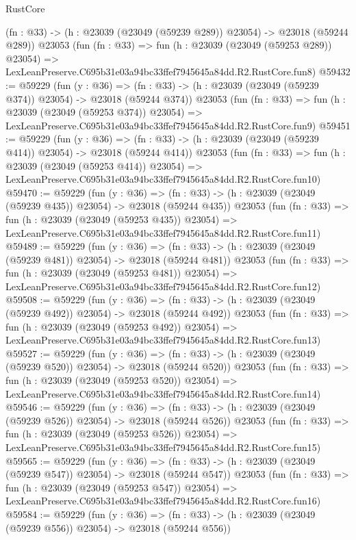 \begin{lexlean}{RustCore}
\begin{coremodule}
    (fn : @33) -> (h : @23039 (@23049 (@59239 @289)) @23054) -> @23018 (@59244 @289))
    @23053
    (fun (fn : @33) =>
    fun (h : @23039 (@23049 (@59253 @289)) @23054) =>
    LexLeanPreserve.C695b31e03a94bc33ffef7945645a84dd.R2.RustCore.fun8)
@59432 := @59229
    (fun (y : @36) =>
    (fn : @33) -> (h : @23039 (@23049 (@59239 @374)) @23054) -> @23018 (@59244 @374))
    @23053
    (fun (fn : @33) =>
    fun (h : @23039 (@23049 (@59253 @374)) @23054) =>
    LexLeanPreserve.C695b31e03a94bc33ffef7945645a84dd.R2.RustCore.fun9)
@59451 := @59229
    (fun (y : @36) =>
    (fn : @33) -> (h : @23039 (@23049 (@59239 @414)) @23054) -> @23018 (@59244 @414))
    @23053
    (fun (fn : @33) =>
    fun (h : @23039 (@23049 (@59253 @414)) @23054) =>
    LexLeanPreserve.C695b31e03a94bc33ffef7945645a84dd.R2.RustCore.fun10)
@59470 := @59229
    (fun (y : @36) =>
    (fn : @33) -> (h : @23039 (@23049 (@59239 @435)) @23054) -> @23018 (@59244 @435))
    @23053
    (fun (fn : @33) =>
    fun (h : @23039 (@23049 (@59253 @435)) @23054) =>
    LexLeanPreserve.C695b31e03a94bc33ffef7945645a84dd.R2.RustCore.fun11)
@59489 := @59229
    (fun (y : @36) =>
    (fn : @33) -> (h : @23039 (@23049 (@59239 @481)) @23054) -> @23018 (@59244 @481))
    @23053
    (fun (fn : @33) =>
    fun (h : @23039 (@23049 (@59253 @481)) @23054) =>
    LexLeanPreserve.C695b31e03a94bc33ffef7945645a84dd.R2.RustCore.fun12)
@59508 := @59229
    (fun (y : @36) =>
    (fn : @33) -> (h : @23039 (@23049 (@59239 @492)) @23054) -> @23018 (@59244 @492))
    @23053
    (fun (fn : @33) =>
    fun (h : @23039 (@23049 (@59253 @492)) @23054) =>
    LexLeanPreserve.C695b31e03a94bc33ffef7945645a84dd.R2.RustCore.fun13)
@59527 := @59229
    (fun (y : @36) =>
    (fn : @33) -> (h : @23039 (@23049 (@59239 @520)) @23054) -> @23018 (@59244 @520))
    @23053
    (fun (fn : @33) =>
    fun (h : @23039 (@23049 (@59253 @520)) @23054) =>
    LexLeanPreserve.C695b31e03a94bc33ffef7945645a84dd.R2.RustCore.fun14)
@59546 := @59229
    (fun (y : @36) =>
    (fn : @33) -> (h : @23039 (@23049 (@59239 @526)) @23054) -> @23018 (@59244 @526))
    @23053
    (fun (fn : @33) =>
    fun (h : @23039 (@23049 (@59253 @526)) @23054) =>
    LexLeanPreserve.C695b31e03a94bc33ffef7945645a84dd.R2.RustCore.fun15)
@59565 := @59229
    (fun (y : @36) =>
    (fn : @33) -> (h : @23039 (@23049 (@59239 @547)) @23054) -> @23018 (@59244 @547))
    @23053
    (fun (fn : @33) =>
    fun (h : @23039 (@23049 (@59253 @547)) @23054) =>
    LexLeanPreserve.C695b31e03a94bc33ffef7945645a84dd.R2.RustCore.fun16)
@59584 := @59229
    (fun (y : @36) =>
    (fn : @33) -> (h : @23039 (@23049 (@59239 @556)) @23054) -> @23018 (@59244 @556))

\end{coremodule}
\end{lexlean}
